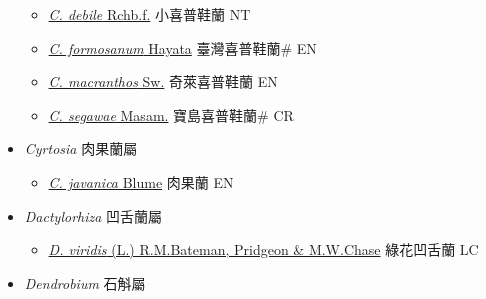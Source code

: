 \begin{itemize}
  \begin{itemize}
        \item[] \href{http://www.theplantlist.org/tpl1.1/search?q=Cypripedium+debile}{\textit{C. debile} Rchb.f.}   小喜普鞋蘭 NT
        \item[] \href{http://www.theplantlist.org/tpl1.1/search?q=Cypripedium+formosanum}{\textit{C. formosanum} Hayata}   臺灣喜普鞋蘭\# EN
        \item[] \href{http://www.theplantlist.org/tpl1.1/search?q=Cypripedium+macranthos}{\textit{C. macranthos} Sw.}   奇萊喜普鞋蘭 EN
        \item[] \href{http://www.theplantlist.org/tpl1.1/search?q=Cypripedium+segawae}{\textit{C. segawae} Masam.}   寶島喜普鞋蘭\# CR
  \end{itemize}
 \item[] \textit{Cyrtosia} 肉果蘭屬
                    
  \begin{itemize}
        \item[] \href{http://www.theplantlist.org/tpl1.1/search?q=Cyrtosia+javanica}{\textit{C. javanica} Blume}   肉果蘭 EN
  \end{itemize}
 \item[] \textit{Dactylorhiza} 凹舌蘭屬
                    
  \begin{itemize}
        \item[] \href{http://www.theplantlist.org/tpl1.1/search?q=Dactylorhiza+viridis}{\textit{D. viridis} (L.) R.M.Bateman, Pridgeon \& M.W.Chase}     綠花凹舌蘭 LC
  \end{itemize}
 \item[] \textit{Dendrobium} 石斛屬
                    

\end{itemize}
